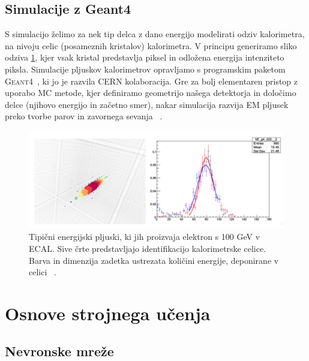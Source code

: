 \documentclass[12pt, a4paper]{article}
\newcommand{\geant}{\textsc{Geant4}\xspace \;}
\begin{document}
\subsection{Simulacije z Geant4}
\label{sec:Geant4}
S simulacijo želimo za nek tip delca z dano energijo modelirati odziv kalorimetra, na nivoju celic (posameznih kristalov) kalorimetra. V principu generiramo sliko odziva \ref{fig:CalorimeterShower}, kjer vsak kristal predstavlja piksel in odložena energija intenziteto piksla. Simulacije pljuskov kalorimetrov opravljamo s programskim paketom \geant~\cite{Geant4}, ki jo je razvila CERN kolaboracija. Gre za bolj elementaren pristop z uporabo MC metode, kjer definiramo geometrijo našega detektorja in določimo delce (njihovo energijo in začetno smer), nakar simulacija razvija EM pljusek preko tvorbe parov in zavornega sevanja ~\cite{Geantclanek}. 
%
\begin{figure}[htb!]
        \centering
        \includegraphics[width=0.95\linewidth]{Images/CalorimeterShower.png}
        \caption{Tipični energijski pljuski, ki jih proizvaja elektron s 100 GeV v ECAL. Sive črte predstavljajo identifikacijo kalorimetrske celice. Barva in dimenzija zadetka ustrezata količini energije, deponirane v celici ~\cite{CalorimeterShower}.}
        \label{fig:CalorimeterShower}
\end{figure}





\section{Osnove strojnega učenja}

\subsection{Nevronske mreže}
\end{document}

